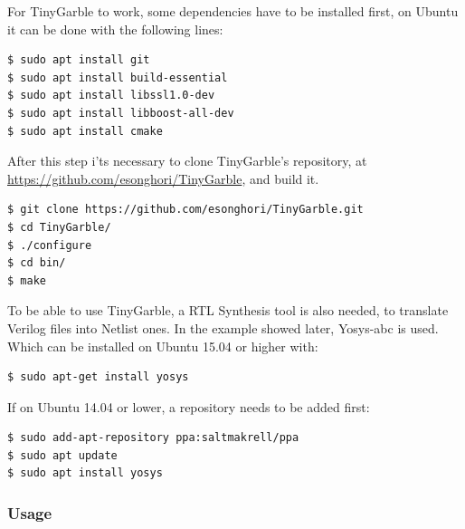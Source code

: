 \begin{refsection}
For TinyGarble to work, some dependencies have to be installed first, on Ubuntu it can be done with the following lines:

\begin{lstlisting}[caption={Installation of TinyGarble's dependencies}, language=bash, captionpos=b] 
$ sudo apt install git
$ sudo apt install build-essential
$ sudo apt install libssl1.0-dev
$ sudo apt install libboost-all-dev
$ sudo apt install cmake
\end{lstlisting}

After this step i'ts necessary to clone TinyGarble's repository, at \url{https://github.com/esonghori/TinyGarble}, and build it.

\begin{lstlisting}[caption={Configuration and compilation of TinyGarble}, language=bash, captionpos=b] 
$ git clone https://github.com/esonghori/TinyGarble.git
$ cd TinyGarble/
$ ./configure
$ cd bin/
$ make
\end{lstlisting}

To be able to use TinyGarble, a RTL Synthesis tool is also needed, to translate Verilog files into Netlist ones. In the example showed later, Yosys-abc is used. Which can be installed on Ubuntu 15.04 or higher with:

\begin{lstlisting}[caption={Installation of Yosys-abc for Ubuntu 15.04>}, language=bash, captionpos=b]                                                                                                                                                                
$ sudo apt-get install yosys
\end{lstlisting}

If on Ubuntu 14.04 or lower, a repository needs to be added first:

\begin{lstlisting}[caption={Installation of Yosys-abc for Ubuntu 14.04<}, language=bash, captionpos=b] 
$ sudo add-apt-repository ppa:saltmakrell/ppa
$ sudo apt update                                                                                                                                                                                             
$ sudo apt install yosys
\end{lstlisting}

\newpage

\subsubsection{Usage}


\end{refsection}
